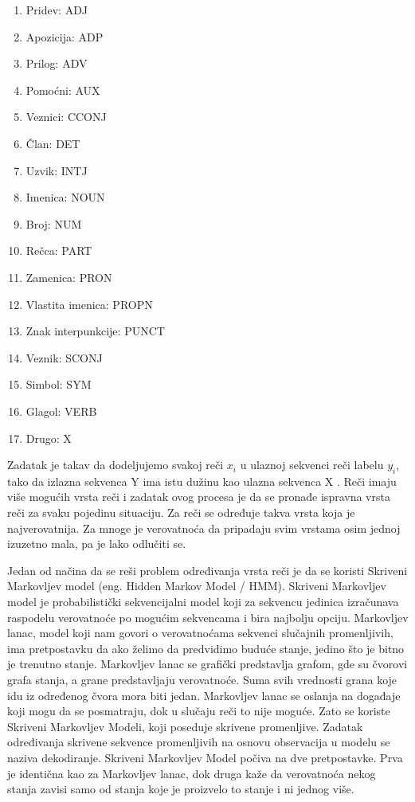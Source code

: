 \documentclass[12pt,oneside]{memoir}
\begin{document}
\begin{enumerate}
\item Pridev: ADJ
\item Apozicija: ADP
\item Prilog: ADV
\item Pomoćni: AUX
\item Veznici: CCONJ
\item Član: DET
\item Uzvik: INTJ
\item Imenica: NOUN
\item Broj: NUM
\item Rečca: PART
\item Zamenica: PRON
\item Vlastita imenica: PROPN
\item Znak interpunkcije: PUNCT
\item Veznik: SCONJ
\item Simbol: SYM
\item Glagol: VERB
\item Drugo: X
\end{enumerate}

Zadatak je takav da dodeljujemo svakoj reči $x_i$ u ulaznoj sekvenci reči labelu $y_i$, tako da izlazna sekvenca Y ima istu dužinu kao ulazna sekvenca X \cite{postagging}. Reči imaju više mogućih vrsta reči i zadatak ovog procesa je da se pronađe ispravna vrsta reči za svaku pojedinu situaciju. Za reči se određuje takva vrsta koja je najverovatnija. Za mnoge je verovatnoća da pripadaju svim vrstama osim jednoj izuzetno mala, pa je lako odlučiti se.

Jedan od načina da se reši problem određivanja vrsta reči je da se koristi Skriveni Markovljev model (eng. Hidden Markov Model / HMM). Skriveni Markovljev model je probabilistički sekvencijalni model koji za sekvencu jedinica izračunava raspodelu verovatnoće po mogućim sekvencama i bira najbolju opciju. Markovljev lanac, model koji nam govori o verovatnoćama sekvenci slučajnih promenljivih, ima pretpostavku da ako želimo da predvidimo buduće stanje, jedino što je bitno je trenutno stanje. Markovljev lanac se grafički predstavlja grafom, gde su čvorovi grafa stanja, a grane predstavljaju verovatnoće. Suma svih vrednosti grana koje idu iz određenog čvora mora biti jedan. Markovljev lanac se oslanja na događaje koji mogu da se posmatraju, dok u slučaju reči to nije moguće. Zato se koriste Skriveni Markovljev Modeli, koji poseduje skrivene promenljive. Zadatak određivanja skrivene sekvence promenljivih na osnovu observacija u modelu se naziva dekodiranje. Skriveni Markovljev Model počiva na dve pretpostavke. Prva je identična kao za Markovljev lanac, dok druga kaže da verovatnoća nekog stanja zavisi samo od stanja koje je proizvelo to stanje i ni jednog više.
\end{document}
